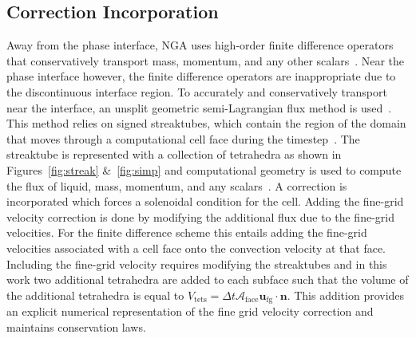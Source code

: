\subsection*{Correction Incorporation} 
Away from the phase interface, NGA uses high-order finite difference operators that conservatively transport mass, momentum, and any other scalars~\cite{NGA2}.  Near the phase interface however, the finite difference operators are inappropriate due to the discontinuous interface region.  To accurately and conservatively transport near the interface, an unsplit geometric semi-Lagrangian flux method is used~\cite{Owkes2017,Owkes2014}. This method relies on signed streaktubes, which contain the region of the domain that moves through a computational cell face during the timestep~\cite{Owkes2017}.  The streaktube is represented with a collection of tetrahedra as shown in Figures~\ref{fig:streak} \&~\ref{fig:simp} and computational geometry is used to compute the flux of liquid, mass, momentum, and any scalars~\cite{Owkes2017}. A correction is incorporated which forces a solenoidal condition for the cell. Adding the fine-grid velocity correction is done by modifying the additional flux due to the fine-grid velocities. For the finite difference scheme this entails adding the fine-grid velocities associated with a cell face onto the convection velocity at that face. Including the fine-grid velocity requires modifying the streaktubes and in this work two additional tetrahedra are added to each subface such that the volume of the additional tetrahedra is equal to $V_\text{tets}=\Delta t \mathcal{A}_\text{face} \bm{u}_\text{fg}\cdot\bm{n}$. This addition provides an explicit numerical representation of the fine grid velocity correction and maintains conservation laws. 

